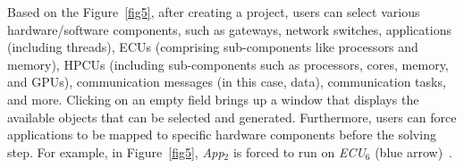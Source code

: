      Based on the Figure~\ref{fig5}, after creating a project, users can select various hardware/software components, such as gateways, network switches, applications (including threads), ECUs (comprising sub-components like processors and memory), HPCUs (including sub-components such as processors, cores, memory, and GPUs), communication messages (in this case, data), communication tasks, and more. Clicking on an empty field brings up a window that displays the available objects that can be selected and generated. Furthermore, users can force applications to be mapped to specific hardware components before the solving step. For example, in Figure~\ref{fig5}, \textit{App$_2$} is forced to run on \textit{ECU$_6$} (blue arrow)~\cite{askaripoor2023designer}.
